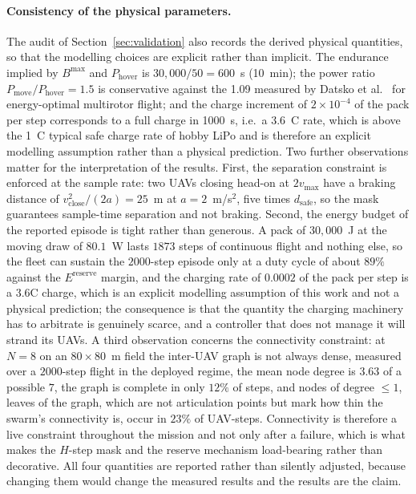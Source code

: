 \documentclass[conference]{IEEEtran}
\newcommand{\tokCsixDegree}{3.63}
\newcommand{\tokCsixMaxdeg}{7}
\newcommand{\tokDutyCycle}{89}
\newcommand{\tokEpisodeSteps}{2000}
\newcommand{\tokMoveDrawW}{80.1}
\newcommand{\tokPackStepsMoving}{1873}
\begin{document}
\paragraph{Consistency of the physical parameters.}
The audit of Section~\ref{sec:validation} also records the derived physical
quantities, so that the modelling choices are explicit rather than implicit.
The endurance implied by $B^{\max}$ and $P_{\mathrm{hover}}$ is
$30{,}000/50=600$~s (10~min); the power ratio $P_{\mathrm{move}}/P_{\mathrm{hover}}=1.5$ is conservative against the 1.09 measured by Datsko et al.~\cite{datsko2024} for energy-optimal multirotor flight; and the charge increment of $2\times10^{-4}$ of the pack per step corresponds to a full charge in 1000~s, i.e.\ a 3.6~C rate, which is above the 1~C typical safe charge rate of hobby LiPo and is therefore an explicit modelling assumption rather than a physical prediction. Two further observations matter for the interpretation of the results. First, the separation constraint is enforced at the sample rate: two UAVs closing head-on at $2v_{\max}$ have a braking distance of $v_{\mathrm{close}}^{2}/(2a)=25$~m at $a=2$~m/s$^2$, five times $d_{\mathrm{safe}}$, so the mask guarantees sample-time separation and not braking. Second, the energy budget of the reported episode is tight rather than generous. A pack of $30{,}000$~J at the moving draw of $\tokMoveDrawW$~W lasts $\tokPackStepsMoving$ steps of continuous flight and nothing else, so the fleet can sustain the $\tokEpisodeSteps$-step episode only at a duty cycle of about $\tokDutyCycle\%$ against the $E^{\mathrm{reserve}}$ margin, and the charging rate of $0.0002$ of the pack per step is a $3.6$C charge, which is an explicit modelling assumption of this work and not a physical prediction; the consequence is that the quantity the charging machinery has to arbitrate is genuinely scarce, and a controller that does not manage it will strand its UAVs. A third observation concerns the connectivity constraint: at $N=8$ on an $80\times80$~m field the inter-UAV graph is not always dense, measured over a $\tokEpisodeSteps$-step flight in the deployed regime, the mean node degree is $\tokCsixDegree$ of a possible $\tokCsixMaxdeg$, the graph is complete in only $12\%$ of steps, and nodes of degree $\le 1$, leaves of the graph, which are not articulation points but mark how thin the swarm's connectivity is, occur in $23\%$ of UAV-steps. Connectivity is therefore a live constraint throughout the mission and not only after a failure, which is what makes the $H$-step mask and the reserve mechanism load-bearing rather than decorative. All four quantities are reported rather than silently adjusted, because changing them would change the measured results and the results are the claim.
\end{document}
